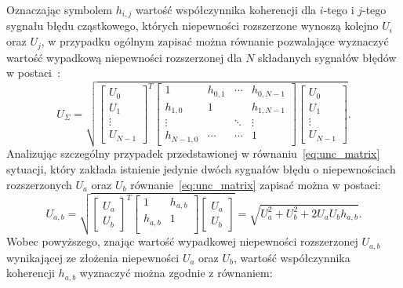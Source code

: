Oznaczając symbolem $h_{i,j}$ wartość współczynnika koherencji dla $i$-tego i $j$-tego sygnału błędu cząstkowego, których niepewności rozszerzone wynoszą kolejno $U_{i}$ oraz $U_{j}$, w przypadku ogólnym zapisać można równanie pozwalające wyznaczyć wartość wypadkową niepewności rozszerzonej dla $N$ składanych sygnałów błędów w postaci~\cite{jakubiec_reductive}:
\begin{equation}
U_{\Sigma} = \sqrt{
\begin{bmatrix}
U_{0} \\ U_{1} \\ \vdots \\ U_{N-1}
\end{bmatrix}^{T}
\begin{bmatrix}
1         & h_{0,1} & \cdots & h_{0,N-1} \\
h_{1,0}   & 1       &        & h_{1,N-1} \\
\vdots    &         & \ddots & \vdots    \\
h_{N-1,0} & \cdots  & \cdots & 1
\end{bmatrix}
\begin{bmatrix}
U_{0} \\ U_{1} \\ \vdots \\ U_{N-1}
\end{bmatrix}}
\label{eq:unc_matrix}.
\end{equation}
Analizując szczególny przypadek przedstawionej w równaniu~\eqref{eq:unc_matrix} sytuacji, który zakłada istnienie jedynie dwóch sygnałów błędu o niepewnościach rozszerzonych $U_{a}$ oraz $U_{b}$ równanie~\eqref{eq:unc_matrix} zapisać można w postaci:
\begin{equation}
U_{a,b} = \sqrt{
\begin{bmatrix}
U_{a} \\ U_{b}
\end{bmatrix}^{T}
\begin{bmatrix}
1         & h_{a,b} \\
h_{a,b}   & 1       \\
\end{bmatrix}
\begin{bmatrix}
U_{a} \\ U_{b}
\end{bmatrix}} =
\sqrt{U_{a}^{2} + U_{b}^{2} + 2 U_{a} U_{b} h_{a,b}}
\label{eq:unc_mattwo}.
\end{equation}
Wobec powyższego, znając wartość wypadkowej niepewności rozszerzonej $U_{a,b}$ wynikającej ze złożenia niepewności $U_{a}$ oraz $U_{b}$, wartość współczynnika koherencji $h_{a,b}$ wyznaczyć można zgodnie z równaniem:
